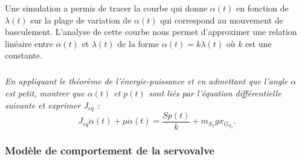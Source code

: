 \documentclass[10pt,fleqn]{article} %
\begin{document}
Une simulation a permis de tracer la courbe qui donne $\alpha(t)$ en fonction de $\lambda(t)$ sur la plage de variation de $\alpha(t)$ qui correspond au mouvement de basculement. L’analyse de cette courbe nous permet d’approximer une relation linéaire entre $\alpha(t)$ et $\lambda(t)$ de la forme $\alpha(t)=k\lambda(t)$ où $k$ est une constante.


\subparagraph{}
\textit{En appliquant le théorème de l’énergie-puissance et en admettant que l’angle $\alpha$ est petit, montrer que $\alpha(t)$ et $p(t)$ sont liés par l’équation différentielle suivante et exprimer $J_{eq}$ :}
$$
J_{eq}\ddot{\alpha}(t)+\mu \dot{\alpha}(t) = \dfrac{Sp(t)}{k}+m_{S_2}gx_{G_{S_2}}.
$$

%
%
%
%


\subsubsection*{Modèle de comportement de la servovalve}
%
%
%
%
%
%
%
%
\end{document}
